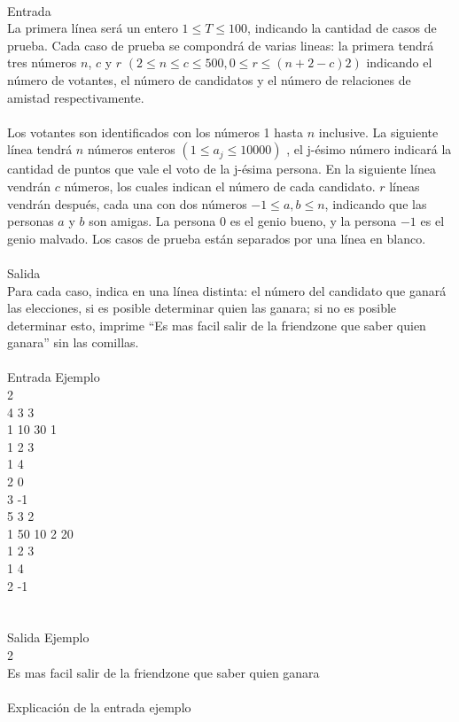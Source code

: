 \documentclass[12pt]{article}
\begin{document}
{{{\\
\textrm{\large Entrada}
\\
La primera línea será un entero $1 ≤ T ≤ 100$, indicando la cantidad de casos de prueba. Cada caso de prueba se compondrá de varias lineas: la primera tendrá tres números $n$, $c$ y $r$ $(2 ≤ n ≤ c ≤ 500, 0 ≤ r ≤ (n + 2 − c)2)$ indicando el número de votantes, el número de candidatos y el número de relaciones de amistad respectivamente.\\
\\Los votantes son identificados con los números 1 hasta $n$ inclusive. La siguiente línea tendrá $n$ números enteros $(1 ≤ a_j ≤ 10000)$ , el j-ésimo número indicará la cantidad de puntos que vale el voto de la j-ésima persona. En la siguiente línea vendrán $c$ números, los cuales indican el número de cada candidato. $r$ líneas vendrán después, cada una con dos números $−1 ≤ a, b ≤ n$, indicando que las personas $a$ y $b$ son amigas. La persona 0 es el genio bueno, y la persona $−1$ es el genio malvado. Los casos de prueba están separados por una línea en blanco.
\\
\\
\textrm{\large Salida}
\\
Para cada caso, indica en una línea distinta: el número del candidato que ganará las elecciones, si es posible determinar quien las ganara; si no es posible determinar esto, imprime “Es mas facil salir de la friendzone que saber quien ganara” sin las comillas.
\\
\\
\textrm{\large Entrada Ejemplo}
\\
2\\
4 3 3\\
1 10 30 1\\
1 2 3\\
1 4\\
2 0\\
3 -1\\
5 3 2\\
1 50 10 2 20\\
1 2 3\\
1 4\\
2 -1\\
\\
\\
\textrm{\large Salida Ejemplo}
\\
2\\
Es mas facil salir de la friendzone que saber quien ganara\\
\\Explicación de la entrada ejemplo\\
}}}
\end{document}
